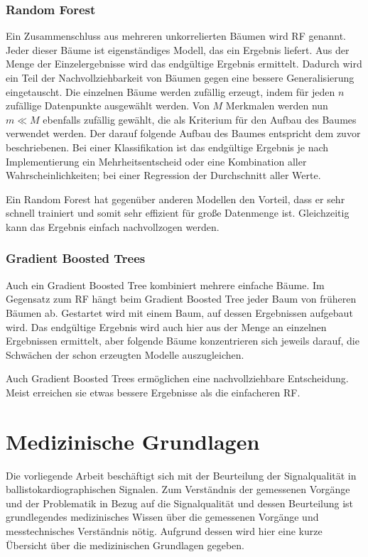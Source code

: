 		\subsubsection{Random Forest}
		
		Ein Zusammenschluss aus mehreren unkorrelierten Bäumen wird \ac{RF} genannt. Jeder dieser Bäume ist eigenständiges Modell, das ein Ergebnis liefert. Aus der Menge der Einzelergebnisse wird das endgültige Ergebnis ermittelt. Dadurch wird ein Teil der Nachvollziehbarkeit von Bäumen gegen eine bessere Generalisierung eingetauscht. Die einzelnen Bäume werden zufällig erzeugt, indem für jeden $n$ zufällige Datenpunkte ausgewählt werden. Von $M$ Merkmalen werden nun $m \ll M$ ebenfalls zufällig gewählt, die als Kriterium für den Aufbau des Baumes verwendet werden. Der darauf folgende Aufbau des Baumes entspricht dem zuvor beschriebenen. Bei einer Klassifikation ist das endgültige Ergebnis je nach Implementierung ein Mehrheitsentscheid oder eine Kombination aller Wahrscheinlichkeiten; bei einer Regression der Durchschnitt aller Werte.
		
		Ein Random Forest hat gegenüber anderen Modellen den Vorteil, dass er sehr schnell trainiert und somit sehr effizient für große Datenmenge ist. Gleichzeitig kann das Ergebnis einfach nachvollzogen werden.
		
		\subsubsection{Gradient Boosted Trees}
		
		Auch ein Gradient Boosted Tree kombiniert mehrere einfache Bäume. Im Gegensatz zum \ac{RF} hängt beim Gradient Boosted Tree jeder Baum von früheren Bäumen ab. Gestartet wird mit einem Baum, auf dessen Ergebnissen aufgebaut wird. Das endgültige Ergebnis wird auch hier aus der Menge an einzelnen Ergebnissen ermittelt, aber folgende Bäume konzentrieren sich jeweils darauf, die Schwächen der schon erzeugten Modelle auszugleichen.
		
		Auch Gradient Boosted Trees ermöglichen eine nachvollziehbare Entscheidung. Meist erreichen sie etwas bessere Ergebnisse als die einfacheren \acl{RF}. %

\section{Medizinische Grundlagen}\label{med-grundlagen}

Die vorliegende Arbeit beschäftigt sich mit der Beurteilung der Signalqualität in ballistokardiographischen Signalen. Zum Verständnis der gemessenen Vorgänge und der Problematik in Bezug auf die Signalqualität und dessen Beurteilung ist grundlegendes medizinisches Wissen über die gemessenen Vorgänge und messtechnisches Verständnis nötig. Aufgrund dessen wird hier eine kurze Übersicht über die medizinischen Grundlagen gegeben.


